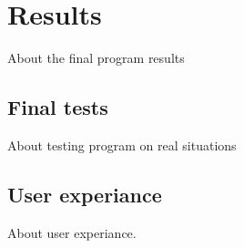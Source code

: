 \chapter{Results}

About the final program results

\section{Final tests}

About testing program on real situations

\section{User experiance}

About user experiance.

